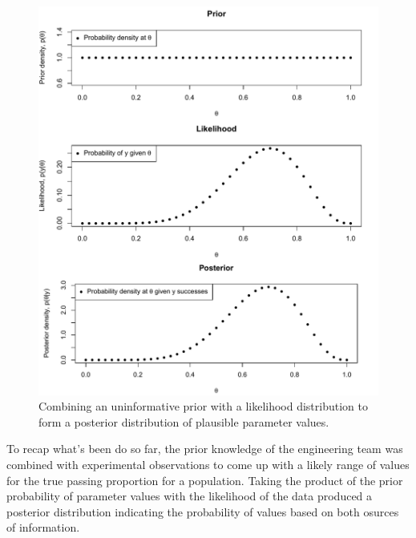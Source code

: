 \documentclass[11pt,a4paper,article]{memoir} %
\begin{document}
\begin{figure}
\includegraphics[width=\textwidth]{Bayesian_inference.pdf}
\caption{Combining an uninformative prior with a likelihood distribution to form a posterior distribution of plausible parameter values.}
\label{fig:binom_bayes_inference}
\end{figure}

To recap what's been do so far, the prior knowledge of the engineering team was combined with experimental observations to come up with a likely range of values for the true passing proportion for a population. Taking the product of the prior probability of parameter values with the likelihood of the data produced a posterior distribution indicating the probability of values based on both osurces of information.
\end{document}
